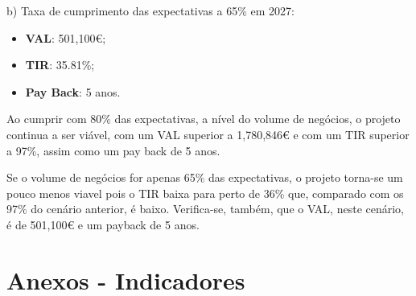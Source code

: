 \documentclass[11pt]{article}
\begin{document}
	b)
	Taxa de cumprimento das expectativas a 65\% em 2027:
	\begin{itemize}
		\item \textbf{VAL}: 501,100€;
		\item \textbf{TIR}: 35.81\%;
		\item \textbf{Pay Back}: 5 anos.
	\end{itemize}
	
	Ao cumprir com 80\% das expectativas, a nível do volume de negócios, o projeto continua a ser viável, com um VAL superior a 1,780,846€ e com um TIR superior a 97\%, assim como um pay back de 5 anos.
	
	Se o volume de negócios for apenas 65\% das expectativas, o projeto torna-se um pouco menos viavel pois o TIR baixa para perto de 36\% que, comparado com os 97\% do cenário anterior, é baixo. Verifica-se, também, que o VAL, neste cenário, é de 501,100€ e um payback de 5 anos.
	
	\pagebreak
	
	\large
	\section{Anexos - Indicadores}
	
	\normalsize
	
\end{document}
